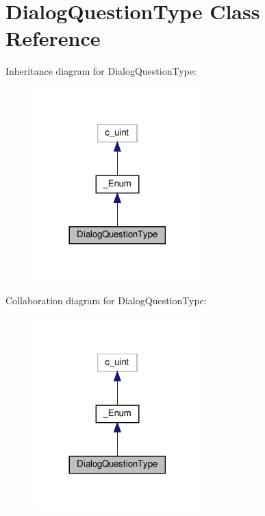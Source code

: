 \hypertarget{classvlc_1_1_dialog_question_type}{}\section{Dialog\+Question\+Type Class Reference}
\label{classvlc_1_1_dialog_question_type}


Inheritance diagram for Dialog\+Question\+Type\+:
\nopagebreak
\begin{figure}[H]
\begin{center}
\leavevmode
\includegraphics[width=185pt]{classvlc_1_1_dialog_question_type__inherit__graph}
\end{center}
\end{figure}


Collaboration diagram for Dialog\+Question\+Type\+:
\nopagebreak
\begin{figure}[H]
\begin{center}
\leavevmode
\includegraphics[width=185pt]{classvlc_1_1_dialog_question_type__coll__graph}
\end{center}
\end{figure}
